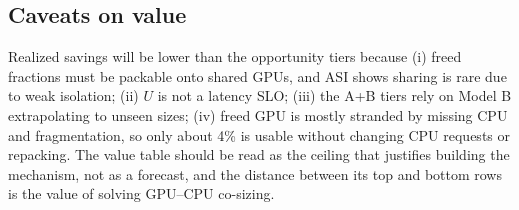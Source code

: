 \subsection{Caveats on value}
Realized savings will be lower than the opportunity tiers because (i) freed fractions must be packable onto shared GPUs, and ASI shows sharing is rare due to weak isolation; (ii) $U$ is not a latency SLO; (iii) the A+B tiers rely on Model B extrapolating to unseen sizes; (iv) freed GPU is mostly stranded by missing CPU and fragmentation, so only about 4\% is usable without changing CPU requests or repacking. The value table should be read as the ceiling that justifies building the mechanism, not as a forecast, and the distance between its top and bottom rows is the value of solving GPU--CPU co-sizing.
